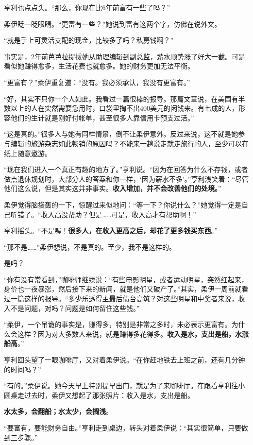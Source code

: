 亨利也点点头。“那么，你现在比6年前富有一些了吗？”

柔伊眨一眨眼睛。“更富有一些？”她说到富有这两个字，仿佛在说外文。

“就是手上可灵活支配的现金，比较多了吗？私房钱啊？”

事实是，2年前芭芭拉提拔她从助理编辑到副总监，薪水顺势涨了好大一截。可是看似她赚得愈多，生活花费也就愈多。她的财务更加无法平衡。

“更富有？”柔伊重复道：“没有。我必须承认，我没有更富有。”

“好，其实不只你一个人如此。我看过一篇很棒的报导。那篇文章说，在美国有半数以上的人在突然需要急用时，口袋里掏不出400美元的闲钱来。有七成的人，形容他们的生计就是刚好付帐单，甚至很多人靠信用卡预支过活。”

“这是真的。”很多人与她有同样情景，倒不让柔伊意外。反过来说，这不就是她参与编辑的旅游杂志如此畅销的原因吗？不能来一趟说走就走旅行的人，至少可以在纸上随意遨游。

“现在我们进入一个真正有趣的地方了。”亨利说。“因为在回答为什么不存钱，或者做点退休规划时，大部分人的答案和你一样，‘因为薪水不多’。”亨利浅笑着：“尽管他们这么说，但是其实这并非事实。\textbf{收入增加，并不会改善他们的处境。}”

柔伊觉得脑袋轰的一下，惊醒过来似地问：“等一下？你说什么？”她觉得一定是自己听错了。“收入高没帮助？但是……可是，收入高才有帮助啊！”

亨利摇头。“不是喔！\textbf{很多人，在收入更高之后，却花了更多钱买东西}。”

“那不是……”柔伊想说，不是真的。至少，我不是这样的。

是吗？

“你有没有常看到，”咖啡师继续说：“有些电影明星，或者运动明星，突然红起来，身价也一夜暴涨，然后接下来的新闻，就是他们又破产了。”其实，柔伊一周前就看过一篇这样的报导。“多少乐透得主最后债台高筑？对这些明星和中奖者来说，收入不是问题，对吗？问题是如何留住这些钱。”

“柔伊，一个吊诡的事实是，赚得多，特别是非常之多时，未必表示更富有。为什么会这样？因为对大多数人来说，就是赚得多花得多。\textbf{收入是水，支出是船，水涨船高}。”

亨利回头望了一眼咖啡厅，又对着柔伊说。“在你赶地铁去上班之前，还有几分钟的时间吗？”

“有的。”柔伊说。她今天早上特别提早出门，就是为了来咖啡厅。在跟着亨利往小圆桌走过去时，柔伊又想起了那张照片：收入是水，支出是船。

\textbf{水太多，会翻船；水太少，会搁浅}。

“要富有，要能财务自由。”亨利走到桌边，转头对着柔伊说：“其实很简单，只要做到三步骤。”

